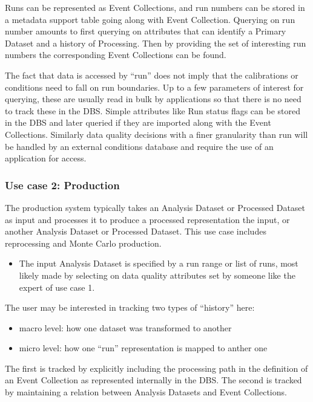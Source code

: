 \documentclass[pdftex]{cmspaper}
\begin{document}
{Runs can be represented as Event Collections, and run numbers can be stored 
in a metadata support table going along with Event Collection.  Querying on 
run number amounts to first querying on attributes that can identify a 
Primary Dataset and a history of Processing.  Then by providing the set of 
interesting run numbers the corresponding Event Collections can be found.

The fact that data is accessed by ``run'' does not imply that the 
calibrations or conditions need to fall on run boundaries.  Up to a few 
parameters of interest for querying, these are usually 
read in bulk by applications so that there is no need to track these in the 
DBS.    Simple attributes like Run status flags 
can be stored in the DBS and later queried 
if they are imported along with the Event Collections.
Similarly data quality decisions with a finer granularity than 
run will be handled by an external conditions database and require 
the use of an application for access. 

\subsubsection{Use case 2: Production}
\label{sec:UCprod}

  The production system typically takes an Analysis Dataset or Processed
Dataset as input and processes it to produce a processed representation the 
input, or another Analysis Dataset or Processed Dataset. This use case 
includes reprocessing and Monte Carlo production.


\begin{itemize}
\item The input Analysis Dataset is specified by a run range or list
     of runs, most likely made by selecting on data quality attributes set by
     someone like the expert of use case 1.  
\end{itemize}

The user may be interested in tracking two types of ``history'' here:
\begin{itemize}
      \item macro level: how one dataset was transformed to another
      \item micro level: how one ``run'' representation is mapped to anther one
\end{itemize}
The first is tracked by explicitly including the processing path in the
definition of an Event Collection as represented internally in the DBS.  
The second is tracked by maintaining a relation between Analysis Datasets
and Event Collections.

}
\end{document}
